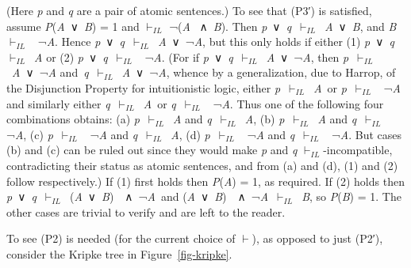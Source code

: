 \documentclass[
  11pt,
  letterpaper,
  DIV=11,
  numbers=noendperiod,
  twoside]{scrartcl}
\begin{document}
(Here \emph{p} and \emph{q} are a pair of atomic sentences.) To see that
(P3′) is satisfied, assume \emph{P}(\emph{A}~∨~\emph{B}) = 1 and
\(\vdash_{IL}\) ¬(\emph{A} ~∧~\emph{B}). Then
\emph{p}~∨~\emph{q}~\(\vdash_{IL}\)~\emph{A}~∨~\emph{B}, and
\emph{B}~\(\vdash_{IL}\)~ ¬\emph{A}. Hence
\emph{p}~∨~\emph{q}~\(\vdash_{IL}\)~\emph{A}~∨~¬\emph{A}, but this only
holds if either (1) \emph{p}~∨~\emph{q}~\(\vdash_{IL}\)~\emph{A} or (2)
\emph{p}~∨~\emph{q}~\(\vdash_{IL}\)~ ¬\emph{A}. (For if
\emph{p}~∨~\emph{q}~\(\vdash_{IL}\)~\emph{A}~∨~¬\emph{A}, then
\emph{p}~\(\vdash_{IL}\)~\emph{A}~∨~¬\emph{A}
and~\emph{q}~\(\vdash_{IL}\)~\emph{A}~∨~¬\emph{A}, whence by a
generalization, due to Harrop, of the Disjunction Property for
intuitionistic logic, either \emph{p}~\(\vdash_{IL}\)~\emph{A}~or
\emph{p}~\(\vdash_{IL}\)~ ¬\emph{A} and similarly either
\emph{q}~\(\vdash_{IL}\)~\emph{A}~or \emph{q}~\(\vdash_{IL}\)~
¬\emph{A}. Thus one of the following four combinations obtains: (a)
\emph{p}~\(\vdash_{IL}\)~\emph{A} and \emph{q}~\(\vdash_{IL}\)~\emph{A},
(b) \emph{p}~\(\vdash_{IL}\)~\emph{A} and \emph{q}~\(\vdash_{IL}\)~
¬\emph{A}, (c) \emph{p}~\(\vdash_{IL}\)~ ¬\emph{A} and
\emph{q}~\(\vdash_{IL}\)~\emph{A}, (d) \emph{p}~\(\vdash_{IL}\)~
¬\emph{A} and \emph{q}~\(\vdash_{IL}\)~ ¬\emph{A}. But cases (b) and (c)
can be ruled out since they would make \emph{p} and \emph{q}
\(\vdash_{IL}\)-incompatible, contradicting their status as atomic
sentences, and from (a) and (d), (1) and (2) follow respectively.) If
(1) first holds then \emph{P}(\emph{A}) = 1, as required. If (2) holds
then
\emph{p}~∨~\emph{q}~\(\vdash_{IL}\)~(\emph{A}~∨~\emph{B})~~∧~¬\emph{A}~and
(\emph{A}~∨~\emph{B})~~∧~¬\emph{A}~\(\vdash_{IL}\)~\emph{B}, so
\emph{P}(\emph{B}) = 1. The other cases are trivial to verify and are
left to the reader.

To see (P2) is needed (for the current choice of \(\vdash\)), as opposed
to just (P2′), consider the Kripke tree in Figure~\ref{fig-kripke}.
\end{document}
